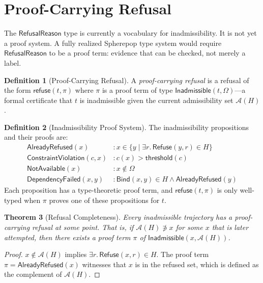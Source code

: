 \documentclass[12pt, a4paper, openany]{book}
\theoremstyle{plain}
\newtheorem{theorem}{Theorem}[chapter]
\theoremstyle{definition}
\newtheorem{definition}[theorem]{Definition}
\theoremstyle{remark}
\newcommand{\Refuse}{\mathsf{Refuse}}
\newcommand{\Bind}{\mathsf{Bind}}
\newcommand{\calA}{\mathcal{A}}
\begin{document}
\section{Proof-Carrying Refusal}

The $\mathsf{RefusalReason}$ type is currently a vocabulary for inadmissibility.
It is not yet a proof system. A fully realized Spherepop type system would require
$\mathsf{RefusalReason}$ to be a proof term: evidence that can be checked, not
merely a label.

\begin{definition}[Proof-Carrying Refusal]
A \emph{proof-carrying refusal} is a refusal of the form
$\mathsf{refuse}(t, \pi)$ where $\pi$ is a proof term of type
$\mathsf{Inadmissible}(t, \Omega)$---a formal certificate that $t$ is inadmissible
given the current admissibility set $\calA(H)$.
\end{definition}

\begin{definition}[Inadmissibility Proof System]
The inadmissibility propositions and their proofs are:
\begin{align*}
\mathsf{AlreadyRefused}(x) &: x \in \{y \mid \exists r.\, \Refuse(y,r) \in H\} \\
\mathsf{ConstraintViolation}(c, x) &: c(x) > \mathsf{threshold}(c) \\
\mathsf{NotAvailable}(x) &: x \notin \Omega \\
\mathsf{DependencyFailed}(x, y) &: \Bind(x,y) \in H \wedge \mathsf{AlreadyRefused}(y)
\end{align*}
Each proposition has a type-theoretic proof term, and $\mathsf{refuse}(t, \pi)$
is only well-typed when $\pi$ proves one of these propositions for $t$.
\end{definition}

\begin{theorem}[Refusal Completeness]
Every inadmissible trajectory has a proof-carrying refusal at some point.
That is, if $\calA(H) \not\ni x$ for some $x$ that is later attempted, then
there exists a proof term $\pi$ of $\mathsf{Inadmissible}(x, \calA(H))$.
\end{theorem}

\begin{proof}
$x \notin \calA(H)$ implies $\exists r.\, \Refuse(x, r) \in H$. The proof term
$\pi = \mathsf{AlreadyRefused}(x)$ witnesses that $x$ is in the refused set,
which is defined as the complement of $\calA(H)$.
\end{proof}
\end{document}
